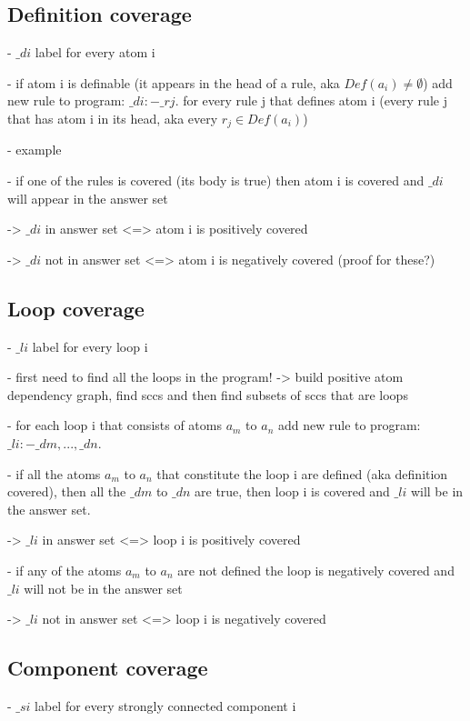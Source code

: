 \subsection{Definition coverage}
\label{subsec:Computing coverage metrics for propositional programs/General approach/Definition coverage}
- $\_di$ label for every atom i

- if atom i is definable (it appears in the head of a rule, aka $Def(a_i)\neq\emptyset$) add new rule to program: $\_di :- \_rj$. for every rule j that defines atom i 
(every rule j that has atom i in its head, aka every $r_j \in Def(a_i)$)

- example

- if one of the rules is covered (its body is true) then atom i is covered and $\_di$ will appear in the answer set

-> $\_di$ in answer set <=> atom i is positively covered

-> $\_di$ not in answer set <=> atom i is negatively covered (proof for these?)

\subsection{Loop coverage}
\label{subsec:Computing coverage metrics for propositional programs/General approach/Loop coverage}
- $\_li$ label for every loop i

- first need to find all the loops in the program! -> build positive atom dependency graph, find sccs and then find subsets of sccs 
that are loops

- for each loop i that consists of atoms $a_m$ to $a_n$ add new rule to program: $\_li :- \_dm, ..., \_dn$.

- if all the atoms $a_m$ to $a_n$ that constitute the loop i are defined (aka definition covered), then all the $\_dm$ to $\_dn$ are true, 
then loop i is covered and $\_li$ will be in the answer set.

-> $\_li$ in answer set <=> loop i is positively covered

- if any of the atoms $a_m$ to $a_n$ are not defined the loop is negatively covered and  $\_li$ will not be in the answer set

-> $\_li$ not in answer set <=> loop i is negatively covered

\subsection{Component coverage}
\label{subsec:Computing coverage metrics for propositional programs/General approach/Component coverage}
- $\_si$ label for every strongly connected component i

